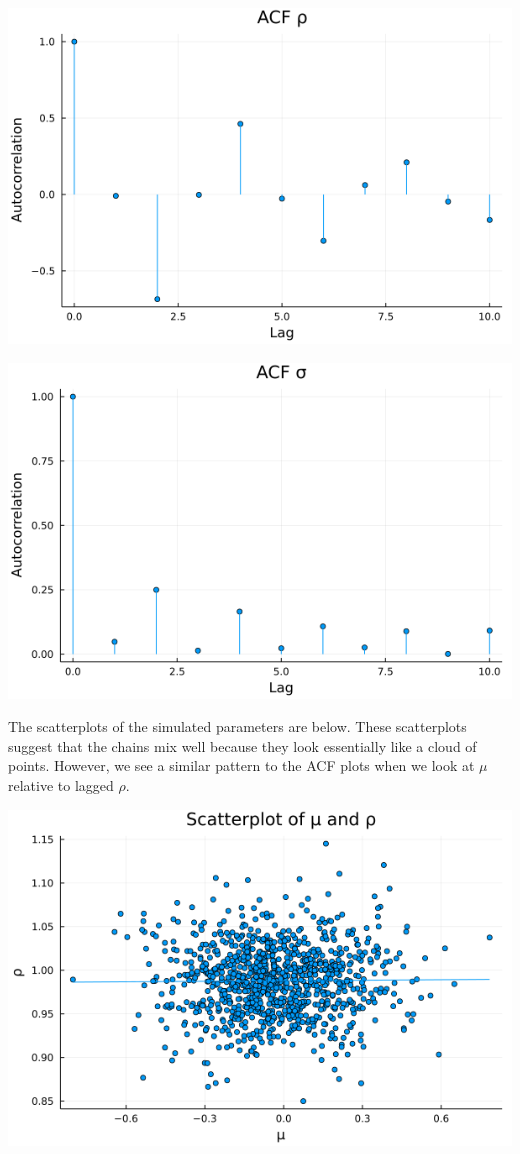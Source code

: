 \documentclass{article}
\begin{document}
\begin{enumerate}
\begin{center}
\includegraphics[scale=0.5]{p2_q3_rho_acf.png}

\includegraphics[scale=0.5]{p2_q3_sigma_acf.png}

\end{center}


The scatterplots of the simulated parameters are below.  These scatterplots suggest that the chains mix well because they look essentially like a cloud of points.  However, we see a similar pattern to the ACF plots when we look at $\mu$ relative to lagged $\rho$.

\begin{center}

\includegraphics[scale=0.5]{p2_q3_mu_rho.png}


\end{center}
\end{enumerate}
\end{document}

